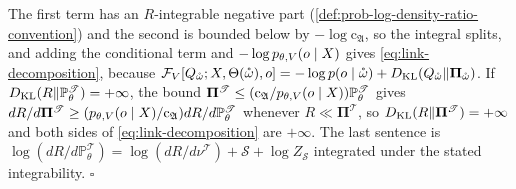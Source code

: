 The first term has an $R$-integrable negative part (\cref{def:prob-log-density-ratio-convention}) and the
second is bounded below by $-\log\mathrm c_{\mathfrak A}$, so the integral splits, and adding the conditional term and
$-\log p_{\theta,V}(o\mid X)$ gives \eqref{eq:link-decomposition}, because
$\mathcal F_V[Q_{\mathring\omega};X,\Theta(\mathring\omega),o]=-\log p(o\mid\mathring\omega)+D_{\mathrm{KL}}(Q_{\mathring\omega}\Vert\boldsymbol\Pi_{\mathring\omega})$.
If $D_{\mathrm{KL}}(R\Vert\mathbb P^{\mathscr T}_\theta)=+\infty$, the bound
$\boldsymbol\Pi^{\mathscr T}\leq(\mathrm c_{\mathfrak A}/p_{\theta,V}(o\mid X))\mathbb P^{\mathscr T}_\theta$ gives
$dR/d\boldsymbol\Pi^{\mathscr T}\geq(p_{\theta,V}(o\mid X)/\mathrm c_{\mathfrak A})dR/d\mathbb P^{\mathscr T}_\theta$ whenever
$R\ll\boldsymbol\Pi^{\mathscr T}$, so $D_{\mathrm{KL}}(R\Vert\boldsymbol\Pi^{\mathscr T})=+\infty$ and both sides of
\eqref{eq:link-decomposition} are $+\infty$. The last sentence is
$\log(dR/d\mathbb P^{\mathscr T}_\theta)=\log(dR/d\nu^{\mathscr T})+\mathscr S+\log Z_{\mathscr S}$ integrated
under the stated integrability. \hfill$\square$


